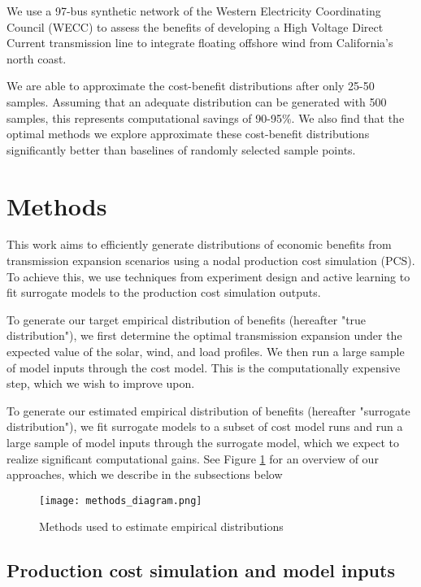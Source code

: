 \documentclass[10pt,twocolumn,letterpaper]{article}
\begin{document}
We use a 97-bus synthetic network of the Western Electricity Coordinating Council (WECC) to assess the benefits of developing a High Voltage Direct Current transmission line to integrate floating offshore wind from California's north coast.

We are able to approximate the cost-benefit distributions after only 25-50 samples. Assuming that an adequate distribution can be generated with 500 samples, this represents computational savings of 90-95\%. We also find that the optimal methods we explore approximate these cost-benefit distributions significantly better than baselines of randomly selected sample points.

\section{Methods}
\label{sec:methods}
This work aims to efficiently generate distributions of economic benefits from transmission expansion scenarios using a nodal production cost simulation (PCS). To achieve this, we use techniques from experiment design and active learning to fit surrogate models to the production cost simulation outputs.

To generate our target empirical distribution of benefits (hereafter "true distribution"), we first determine the optimal transmission expansion under the expected value of the solar, wind, and load profiles. We then run a large sample of model inputs through the cost model. This is the computationally expensive step, which we wish to improve upon. 

To generate our estimated empirical distribution of benefits (hereafter "surrogate distribution"), we fit surrogate models to a subset of cost model runs and run a large sample of model inputs through the surrogate model, which we expect to realize significant computational gains. See Figure \ref{fig:methods} for an overview of our approaches, which we describe in the subsections below

\begin{figure}[!htbp]
    \centering
    \texttt{[image: methods\_diagram.png]}
    \caption{\label{fig:methods}Methods used to estimate empirical distributions}
\end{figure}

\subsection{Production cost simulation and model inputs}
\end{document}
